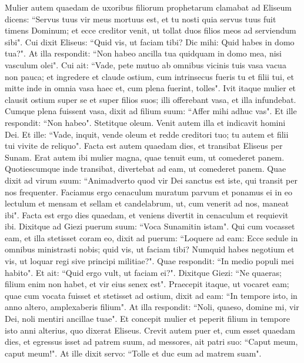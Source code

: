 \begin{biblechapter}  
\verse Mulier autem quaedam de uxoribus filiorum prophetarum clamabat ad Eliseum dicens: “Servus tuus vir meus mortuus est, et tu nosti quia servus tuus fuit timens Dominum; et ecce creditor venit, ut tollat duos filios meos ad serviendum sibi". 
\verse Cui dixit Eliseus: “Quid vis, ut faciam tibi? Dic mihi: Quid habes in domo tua?". At illa respondit: “Non habeo ancilla tua quidquam in domo mea, nisi vasculum olei". 
\verse Cui ait: “Vade, pete mutuo ab omnibus vicinis tuis vasa vacua non pauca; 
\verse et ingredere et claude ostium, cum intrinsecus fueris tu et filii tui, et mitte inde in omnia vasa haec et, cum plena fuerint, tolles". 
\verse Ivit itaque mulier et clausit ostium super se et super filios suos; illi offerebant vasa, et illa infundebat. 
\verse Cumque plena fuissent vasa, dixit ad filium suum: “Affer mihi adhuc vas". Et ille respondit: “Non habeo". Stetitque oleum. 
\verse Venit autem illa et indicavit homini Dei. Et ille: “Vade, inquit, vende oleum et redde creditori tuo; tu autem et filii tui vivite de reliquo". 
\verse Facta est autem quaedam dies, et transibat Eliseus per Sunam. Erat autem ibi mulier magna, quae tenuit eum, ut comederet panem. Quotiescumque inde transibat, divertebat ad eam, ut comederet panem. 
\verse Quae dixit ad virum suum: “Animadverto quod vir Dei sanctus est iste, qui transit per nos frequenter.  
\verse Faciamus ergo cenaculum muratum parvum et ponamus ei in eo lectulum et mensam et sellam et candelabrum, ut, cum venerit ad nos, maneat ibi". 
\verse Facta est ergo dies quaedam, et veniens divertit in cenaculum et requievit ibi. 
\verse Dixitque ad Giezi puerum suum: “Voca Sunamitin istam". Qui cum vocasset eam, et illa stetisset coram eo, 
\verse dixit ad puerum: “Loquere ad eam: Ecce sedule in omnibus ministrasti nobis; quid vis, ut faciam tibi? Numquid habes negotium et vis, ut loquar regi sive principi militiae?". Quae respondit: “In medio populi mei habito". 
\verse Et ait: “Quid ergo vult, ut faciam ei?". Dixitque Giezi: “Ne quaeras; filium enim non habet, et vir eius senex est". 
\verse Praecepit itaque, ut vocaret eam; quae cum vocata fuisset et stetisset ad ostium, 
\verse dixit ad eam: “In tempore isto, in anno altero, amplexaberis filium". At illa respondit: “Noli, quaeso, domine mi, vir Dei, noli mentiri ancillae tuae". 
\verse Et concepit mulier et peperit filium in tempore isto anni alterius, quo dixerat Eliseus. 
\verse Crevit autem puer et, cum esset quaedam dies, et egressus isset ad patrem suum, ad messores, 
\verse ait patri suo: “Caput meum, caput meum!". At ille dixit servo: “Tolle et duc eum ad matrem suam". 

\end{biblechapter}
